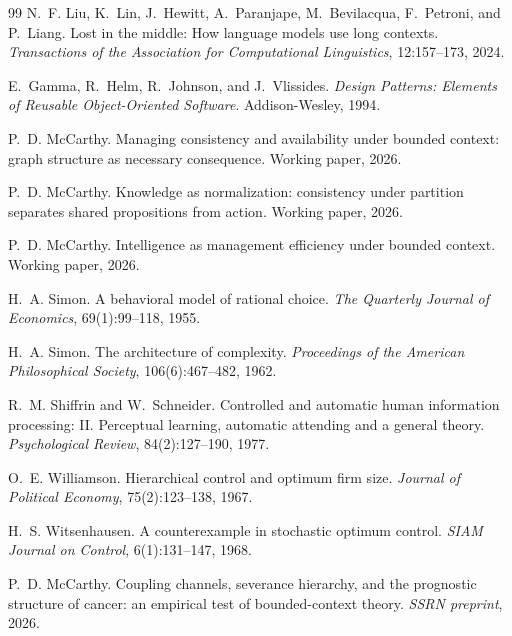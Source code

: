 \documentclass[11pt]{article}
\theoremstyle{definition}
\begin{document}
\begin{thebibliography}{99}
N.~F. Liu, K.~Lin, J.~Hewitt, A.~Paranjape, M.~Bevilacqua, F.~Petroni, and
  P.~Liang.
\newblock Lost in the middle: How language models use long contexts.
\newblock \emph{Transactions of the Association for Computational Linguistics},
  12:157--173, 2024.

E.~Gamma, R.~Helm, R.~Johnson, and J.~Vlissides.
\newblock \emph{Design Patterns: Elements of Reusable Object-Oriented Software}.
\newblock Addison-Wesley, 1994.

P.~D. McCarthy.
\newblock Managing consistency and availability under bounded context:
  graph structure as necessary consequence.
\newblock Working paper, 2026.

P.~D. McCarthy.
\newblock Knowledge as normalization: consistency under partition separates
  shared propositions from action.
\newblock Working paper, 2026.

P.~D. McCarthy.
\newblock Intelligence as management efficiency under bounded context.
\newblock Working paper, 2026.

H.~A. Simon.
\newblock A behavioral model of rational choice.
\newblock \emph{The Quarterly Journal of Economics}, 69(1):99--118, 1955.

H.~A. Simon.
\newblock The architecture of complexity.
\newblock \emph{Proceedings of the American Philosophical Society},
  106(6):467--482, 1962.

R.~M. Shiffrin and W.~Schneider.
\newblock Controlled and automatic human information processing: {II}.
  Perceptual learning, automatic attending and a general theory.
\newblock \emph{Psychological Review}, 84(2):127--190, 1977.

O.~E. Williamson.
\newblock Hierarchical control and optimum firm size.
\newblock \emph{Journal of Political Economy}, 75(2):123--138, 1967.

H.~S. Witsenhausen.
\newblock A counterexample in stochastic optimum control.
\newblock \emph{SIAM Journal on Control}, 6(1):131--147, 1968.

P.~D. McCarthy.
\newblock Coupling channels, severance hierarchy, and the prognostic
structure of cancer: an empirical test of bounded-context theory.
\newblock \emph{SSRN preprint}, 2026.

\end{thebibliography}
\end{document}
